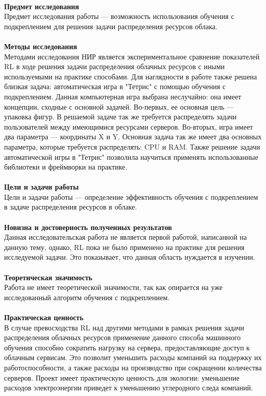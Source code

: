 \documentclass[draft]{article}
\begin{document}
~\\
\textbf{Предмет исследования}\\
Предмет исследования работы — возможность использования обучения с подкреплением для решения задачи распределения ресурсов облака.\\
~\\
\textbf{Методы исследования}\\
Методами исследования НИР является экспериментальное сравнение показателей RL в ходе решения задачи распределения облачных ресурсов с иными используемыми на практике способами. Для наглядности в работе также решена близкая задача: автоматическая игра в "Тетрис" с помощью обучения с подкреплением.  Данная компьютерная игра выбрана неслучайно: она имеет концепции, сходные с основной задачей. Во-первых, ее основная цель — упаковка фигур. В решаемой задаче так же требуется распределять задачи пользователей между имеющимися ресурсами серверов. Во-вторых, игра имеет два параметра — координаты X и Y. Основная задача так же имеет два основных параметра, которые требуется распределять: CPU и RAM. Также решение задачи автоматической игры в "Тетрис" позволила научиться применять использованные библиотеки и фреймворки на практике.\\
~\\
\textbf{Цели и задачи работы}\\
Цели и задачи работы — определение эффективность обучения с подкреплением в задаче распределения ресурсов в облаке.\\
~\\
\textbf{Новизна и достоверность полученных результатов}\\
Данная исследовательская работа не является первой работой, написанной на данную тему, однако, RL пока не было применено на практике для решения исследуемой задачи. Это показывает, что данная область нуждается в изучении.\\
~\\
\textbf{Теоретическая значимость}\\
Работа не имеет теоретической значимости, так как опирается на уже исследованный алгоритм обучения с подкреплением.\\
~\\
\textbf{Практическая ценность}\\
В случае превосходства RL над другими методами в рамках решения задачи распределения облачных ресурсов применение данного способа машинного обучения способно сократить нагрузку на сервера, предоставляющие доступ к облачным сервисам. Это позволит уменьшить расходы компаний на поддержку их работоспособности, а также расходы на производство при сокращении количества серверов. Проект имеет практическую ценность для экологии: уменьшение расходов электроэнергии приведет к уменьшению углеродного следа компаний.\\
\end{document}
